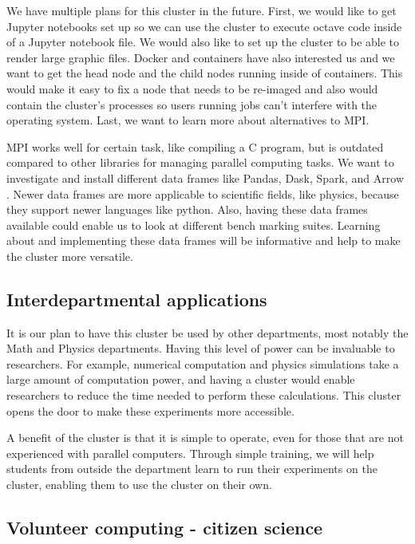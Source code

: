 \documentclass[12pt]{article}
\begin{document}
We have multiple plans for this cluster in the future. First, we would like to get Jupyter notebooks set up so we can use the cluster to execute octave code inside of a Jupyter notebook file. We would also like to set up the cluster to be able to render large graphic files. Docker and containers have also interested us and we want to get the head node and the child nodes running inside of containers. This would make it easy to fix a node that needs to be re-imaged and also would contain the cluster's processes so users running jobs can't interfere with the operating system. Last, we want to learn more about alternatives to MPI.

MPI works well for certain task, like compiling a C program, but is outdated compared to other libraries for managing parallel computing tasks. We want to investigate and install different data frames like Pandas, Dask, Spark, and Arrow \cite{pybench}. Newer data frames are more applicable to scientific fields, like physics, because they support newer languages like python. Also, having these data frames available could enable us to look at different bench marking suites. Learning about and implementing these data frames will be informative and help to make the cluster more versatile.

\subsection{Interdepartmental applications}
 
It is our plan to have this cluster be used by other departments, most notably the Math and Physics departments. Having this level of power can be invaluable to researchers. For example, numerical computation and physics simulations take a large amount of computation power, and having a cluster would enable researchers to reduce the time needed to perform these calculations. This cluster opens the door to make these experiments more accessible.

A benefit of the cluster is that it is simple to operate, even for those that are not experienced with parallel computers. Through simple training, we will help students from outside the department learn to run their experiments on the cluster, enabling them to use the cluster on their own. 

\subsection{Volunteer computing - citizen science}
\end{document}
